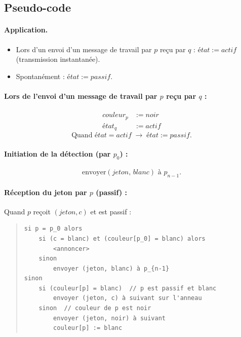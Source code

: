 \documentclass[12pt,a4paper]{article}
\theoremstyle{definition}
\theoremstyle{remark}
\newcommand{\etat}{\mathit{état}}
\newcommand{\couleur}[1]{\mathit{couleur}_{#1}}
\begin{document}
\subsection{Pseudo-code}

\paragraph{Application.}
\begin{itemize}
  \item Lors d'un envoi d'un message de travail par $p$ reçu par $q$ :
        $\etat := \mathit{actif}$ \quad (transmission instantanée).
  \item Spontanément : $\etat := \mathit{passif}$.
\end{itemize}

\paragraph{Lors de l'envoi d'un message de travail par $p$ reçu par $q$ :}
\begin{align*}
  \couleur{p} &:= \mathit{noir} \\
  \etat_q     &:= \mathit{actif}
\end{align*}
\[
  \text{Quand } \etat = \mathit{actif} \;\longrightarrow\; \etat := \mathit{passif}.
\]

\paragraph{Initiation de la détection (par $p_0$) :}
\[
  \text{envoyer}(\mathit{jeton},\, \mathit{blanc}) \text{ à } p_{n-1}.
\]

\paragraph{Réception du jeton par $p$ (passif) :}
Quand $p$ reçoit $(\mathit{jeton}, c)$ et est passif :
\begin{quote}
\begin{verbatim}
si p = p_0 alors
    si (c = blanc) et (couleur[p_0] = blanc) alors
        <annoncer>
    sinon
        envoyer (jeton, blanc) à p_{n-1}
sinon
    si (couleur[p] = blanc)  // p est passif et blanc
        envoyer (jeton, c) à suivant sur l'anneau
    sinon  // couleur de p est noir
        envoyer (jeton, noir) à suivant
        couleur[p] := blanc
\end{verbatim}
\end{quote}
\end{document}
